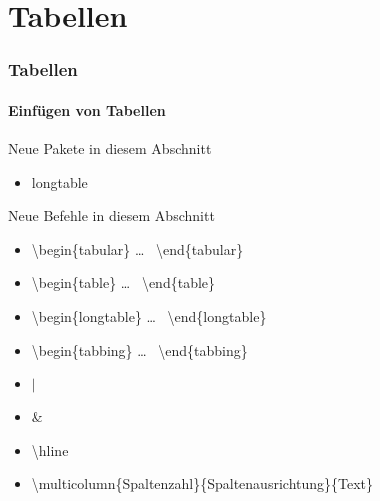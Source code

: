 \section{Tabellen}

\begin{frame}
\frametitle{Tabellen}
\framesubtitle{Einf\"ugen von Tabellen}

\begin{exampleblock}{Neue Pakete in diesem Abschnitt}
\begin{itemize}
\item longtable
\end{itemize}
\end{exampleblock}

\begin{block}{Neue Befehle in diesem Abschnitt}
\begin{itemize}
\item \color{unibablueI}\textbackslash begin\color{black}\{tabular\} \dots
~\color{unibablueI}\textbackslash end\color{black}\{tabular\}
\item \color{unibablueI}\textbackslash begin\color{black}\{table\} \dots
~\color{unibablueI}\textbackslash end\color{black}\{table\}
\item \color{unibablueI}\textbackslash begin\color{black}\{longtable\} \dots
~\color{unibablueI}\textbackslash end\color{black}\{longtable\}
\item \color{unibablueI}\textbackslash begin\color{black}\{tabbing\} \dots
~\color{unibablueI}\textbackslash end\color{black}\{tabbing\}
\item \color{nounibaredI}$|$\color{black}
\item \color{nounibaredI}\& \color{black}
\item \color{nounibaredI}\textbackslash hline\color{black}
\item \color{nounibaredI}\textbackslash multicolumn\color{black}\{Spaltenzahl\}\{Spaltenausrichtung\}\{Text\}
\end{itemize}
\end{block}

\end{frame}


